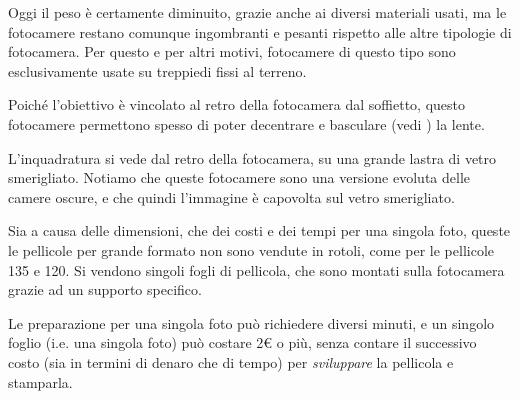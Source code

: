 Oggi il peso è certamente diminuito, grazie anche ai diversi materiali usati, ma le fotocamere restano comunque ingombranti e pesanti rispetto alle altre tipologie di fotocamera.
Per questo e per altri motivi, fotocamere di questo tipo sono esclusivamente usate su treppiedi fissi al terreno.

Poiché l'obiettivo è vincolato al retro della fotocamera dal soffietto, questo fotocamere permettono spesso di poter decentrare e basculare (vedi ) la lente.

L'inquadratura si vede dal retro della fotocamera, su una grande lastra di vetro smerigliato. Notiamo che queste fotocamere sono una versione evoluta delle camere oscure, e che quindi l'immagine è capovolta sul vetro smerigliato.

Sia a causa delle dimensioni, che dei costi e dei tempi per una singola foto, queste le pellicole per grande formato non sono vendute in rotoli, come per le pellicole 135 e 120.
Si vendono singoli fogli di pellicola, che sono montati sulla fotocamera grazie ad un supporto specifico.

Le preparazione per una singola foto può richiedere diversi minuti, e un singolo foglio (i.e. una singola foto) può costare 2$\euro$ o più, senza contare il successivo costo (sia in termini di denaro che di tempo) per \textit{sviluppare} la pellicola e stamparla.